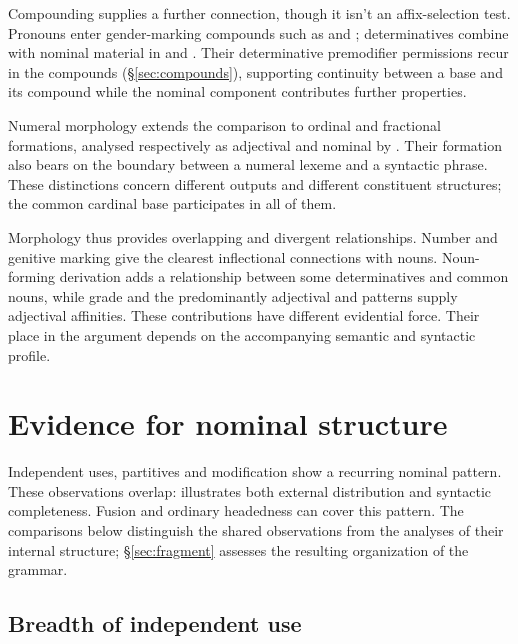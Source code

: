 \documentclass[12pt]{article}
\begin{document}
Compounding supplies a further connection, though it isn't an affix-selection test. Pronouns enter gender-marking compounds such as  and  \citep[Ch.~19, §5.3]{huddleston2002}; determinatives combine with nominal material in  and . Their determinative premodifier permissions recur in the compounds (§\ref{sec:compounds}), supporting continuity between a base and its compound while the nominal component contributes further properties.

Numeral morphology extends the comparison to ordinal and fractional formations, analysed respectively as adjectival and nominal by \textcite{reynolds2026numerals}. Their formation also bears on the boundary between a numeral lexeme and a syntactic phrase. These distinctions concern different outputs and different constituent structures; the common cardinal base participates in all of them.

Morphology thus provides overlapping and divergent relationships. Number and genitive marking give the clearest inflectional connections with nouns. Noun-forming derivation adds a relationship between some determinatives and common nouns, while grade and the predominantly adjectival  and  patterns supply adjectival affinities. These contributions have different evidential force. Their place in the argument depends on the accompanying semantic and syntactic profile.

\section{Evidence for nominal structure}\label{sec:evidence}

Independent uses, partitives and modification show a recurring nominal pattern. These observations overlap:  illustrates both external distribution and syntactic completeness. Fusion and ordinary headedness can cover this pattern. The comparisons below distinguish the shared observations from the analyses of their internal structure; §\ref{sec:fragment} assesses the resulting organization of the grammar.

\subsection{Breadth of independent use}\label{sec:independent}
\end{document}
